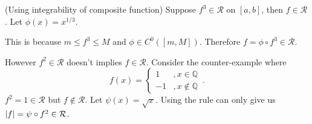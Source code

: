\documentclass{article}
\newcommand{\Q}{\mathbb Q}
\newcommand{\Riemann}{\mathcal R}
\DeclarePairedDelimiter\abs{\lvert}{\rvert}
\begin{document}
\begin{example} (Using integrability of composite function)
    Suppose $ f^3 \in \Riemann $ on $ [a, b] $, then $ f \in \Riemann $. Let $ \phi(x) = x^{1/3} $.
    
    This is because $ m \leqslant f^3 \leqslant M $ and $ \phi \in C^0([m, M]) $. Therefore $ f = \phi \circ f^3 \in \Riemann $.

    However $ f^2 \in \Riemann $ doesn't implies $ f \in \Riemann $. Consider the counter-example where
    \[ 
        f(x) =
        \begin{cases}
            1 &, x \in \Q \\
            -1 &, x \not\in \Q
        \end{cases} \,.
    \]
    $ f^2 = 1 \in \Riemann $ but $ f \not\in \Riemann $. Let $ \psi (x) = \sqrt{x} $. Using the rule can only give us $ \abs{ f } = \psi \circ f^2 \in \Riemann $.
\end{example}
\end{document}
